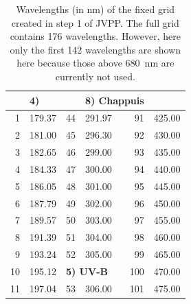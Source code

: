 \documentclass[a4paper,twoside]{article}
\newcommand{\IT}[1]{#1\index{#1}}
\renewcommand{\arraystretch}{1}
\newcommand{\bottomhline}{\noalign{\vspace{1mm}}\hline}
\begin{document}
\begin{table}[tbh]
  \begin{center}
    \renewcommand{\arraystretch}{1.05}
    \caption{Wavelengths (in nm) of the fixed grid created in step 1 of
      \IT{JVPP}. The full grid contains 176 wavelengths. However, here only
      the first 142 wavelengths are shown here because those above
      680~nm are currently not used.}
    \label{tab:wave176}
    \small
    \begin{tabular}{|rp{}|rp{}|rp{}|}
      \bottomhline
      \multicolumn{2}{|l|}{\bf 1) Schumann-Runge} & \multicolumn{2}{|l|}{\bf 4)}      & \multicolumn{2}{|l|}{\bf 8) Chappuis} \\\hline
        1 & 179.37                                &  44 & 291.97                      &  91 & 425.00                          \\
        2 & 181.00                                &  45 & 296.30                      &  92 & 430.00                          \\
        3 & 182.65                                &  46 & 299.00                      &  93 & 435.00                          \\
        4 & 184.33                                &  47 & 300.00                      &  94 & 440.00                          \\
        5 & 186.05                                &  48 & 301.00                      &  95 & 445.00                          \\
        6 & 187.79                                &  49 & 302.00                      &  96 & 450.00                          \\
        7 & 189.57                                &  50 & 303.00                      &  97 & 455.00                          \\
        8 & 191.39                                &  51 & 304.00                      &  98 & 460.00                          \\
        9 & 193.24                                &  52 & 305.00                      &  99 & 465.00                          \\\cline{3-4}
       10 & 195.12                                & \multicolumn{2}{|l|}{\bf 5) UV-B} & 100 & 470.00                          \\\cline{3-4}
       11 & 197.04                                &  53 & 306.00                      & 101 & 475.00                          \\

\end{tabular}
\end{center}
\end{table}
\end{document}

